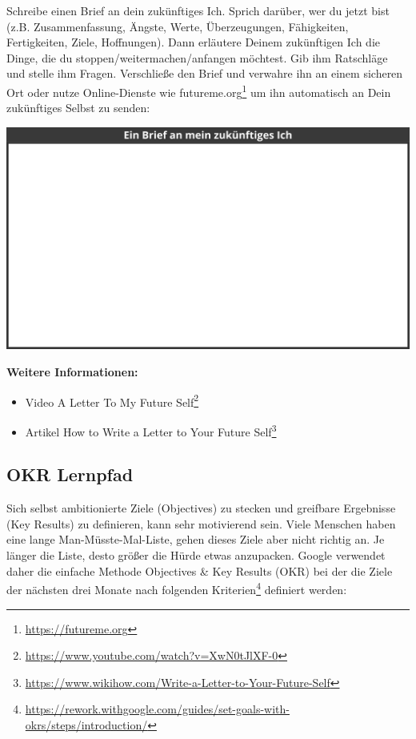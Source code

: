 \documentclass[
  ngerman,
  paper=a4,
,captions=tableheading
]{scrartcl}
\DeclareRobustCommand{\href}[2]{#2\footnote{\url{#1}}}
\providecommand{\tightlist}{%
  \setlength{\itemsep}{0pt}\setlength{\parskip}{0pt}}
\begin{document}
Schreibe einen Brief an dein zukünftiges Ich. Sprich darüber, wer du
jetzt bist (z.B. Zusammenfassung, Ängste, Werte, Überzeugungen,
Fähigkeiten, Fertigkeiten, Ziele, Hoffnungen). Dann erläutere Deinem
zukünftigen Ich die Dinge, die du stoppen/weitermachen/anfangen
möchtest. Gib ihm Ratschläge und stelle ihm Fragen. Verschließe den
Brief und verwahre ihn an einem sicheren Ort oder nutze Online-Dienste
wie \href{https://futureme.org}{futureme.org} um ihn automatisch an Dein
zukünftiges Selbst zu senden:

\includegraphics{./tex2pdf.-c0ed5a8631023970/15a0f9300a5b0066a418f759ebc52be34fb130a8.png}

\textbf{Weitere Informationen:}

\begin{itemize}
\tightlist
\item
  Video \href{https://www.youtube.com/watch?v=XwN0tJlXF-0}{A Letter To
  My Future Self}
\item
  Artikel
  \href{https://www.wikihow.com/Write-a-Letter-to-Your-Future-Self}{How
  to Write a Letter to Your Future Self}
\end{itemize}

\hypertarget{okr-lernpfad}{%
\subsection{OKR Lernpfad}\label{okr-lernpfad}}

Sich selbst ambitionierte Ziele (Objectives) zu stecken und greifbare
Ergebnisse (Key Results) zu definieren, kann sehr motivierend sein.
Viele Menschen haben eine lange Man-Müsste-Mal-Liste, gehen dieses Ziele
aber nicht richtig an. Je länger die Liste, desto größer die Hürde etwas
anzupacken. Google verwendet daher die einfache Methode Objectives \&
Key Results (OKR) bei der die Ziele der nächsten drei Monate
\href{https://rework.withgoogle.com/guides/set-goals-with-okrs/steps/introduction/}{nach
folgenden Kriterien} definiert werden:
\end{document}
